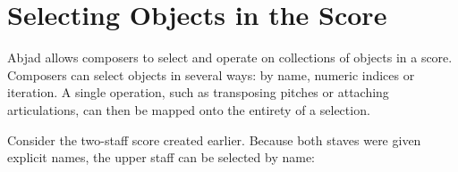 \documentclass{article}
\begin{document}

\section{Selecting Objects in the Score} \label{sec:selection-flexibility}

Abjad allows composers to select and operate on collections of objects in a
score. Composers can select objects in several ways: by name, numeric indices
or iteration. A single operation, such as transposing pitches or attaching
articulations, can then be mapped onto the entirety of a selection.

Consider the two-staff score created earlier. Because both staves were given
explicit names, the upper staff can be selected by name:

\end{document}
